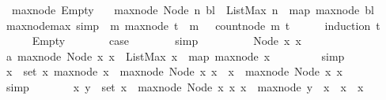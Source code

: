 \begin{isabellebody}
\ \ {\isachardoublequoteopen}max{\isacharunderscore}node\ Empty\ {\isacharequal}\ {}{\isachardoublequoteclose}\isanewline
{\isacharbar}\ {\isachardoublequoteopen}max{\isacharunderscore}node\ {\isacharparenleft}Node\ n\ bl{\isacharparenright}\ {\isacharequal}\ ListMax\ {\isacharparenleft}n\ {\isacharhash}\ {\isacharparenleft}map\ max{\isacharunderscore}node\ bl{\isacharparenright}{\isacharparenright}{\isachardoublequoteclose}\isanewline
\ \ \isanewline
{}\isamarkupfalse%
\ max{\isacharunderscore}node{\isacharunderscore}max\ {\isacharbrackleft}simp{\isacharbrackright}{\isacharcolon}\ {\isachardoublequoteopen}{\isasymforall}\ m{\isachardot}\ max{\isacharunderscore}node\ t\ {\isacharless}\ m\ \ {\isasymlongrightarrow}\ count{\isacharunderscore}node\ m\ t\ {\isacharequal}\ {}{\isachardoublequoteclose}\isanewline
%
\isadelimproof
\ \ %
\endisadelimproof
%
\isatagproof
{}\isamarkupfalse%
\ {\isacharparenleft}induction\ t{\isacharparenright}\isanewline
\ \ \ \ \isamarkupfalse%
\ Empty\isanewline
\ \ \ \ \isamarkupfalse%
\ \isamarkupfalse%
\ {\isacharquery}case\isanewline
\ \ \ \ \ \ \isamarkupfalse%
\ simp\ \isanewline
\ \ \isamarkupfalse%
\isanewline
\ \ \ \ \isamarkupfalse%
\ {\isacharparenleft}Node\ x{}\ x{}{\isacharparenright}\isanewline
\ \ \ \ \isamarkupfalse%
\ a{\isacharcolon}\ {\isachardoublequoteopen}max{\isacharunderscore}node\ {\isacharparenleft}Node\ x{}\ x{}{\isacharparenright}\ {\isacharequal}\ ListMax\ {\isacharparenleft}x{}\ {\isacharhash}\ {\isacharparenleft}map\ max{\isacharunderscore}node\ x{}{\isacharparenright}{\isacharparenright}{\isachardoublequoteclose}\ \isanewline
\ \ \ \ \ \ \isamarkupfalse%
\ simp\isanewline
\ \ \ \ \isamarkupfalse%
\ \isamarkupfalse%
\ {\isachardoublequoteopen}{\isasymforall}x\ {\isasymin}\ set\ x{}{\isachardot}\ max{\isacharunderscore}node\ x\ {\isasymle}\ max{\isacharunderscore}node\ {\isacharparenleft}Node\ x{}\ x{}{\isacharparenright}\ {\isasymand}\ x{}\ {\isasymle}\ max{\isacharunderscore}node\ {\isacharparenleft}Node\ x{}\ x{}{\isacharparenright}{\isachardoublequoteclose}\isanewline
\ \ \ \ \ \ \isamarkupfalse%
\ simp\isanewline
\ \ \ \ \isamarkupfalse%
\ \isamarkupfalse%
\ {\isachardoublequoteopen}{\isasymforall}x{\isachardot}\ {\isasymforall}y\ {\isasymin}\ set\ x{}\ {\isachardot}\ max{\isacharunderscore}node\ {\isacharparenleft}Node\ x{}\ x{}{\isacharparenright}{\isacharless}\ x\ {\isasymlongrightarrow}\ max{\isacharunderscore}node\ y\ {\isacharless}\ x\ {\isasymand}\ x{}\ {\isacharless}\ x{\isachardoublequoteclose}\isanewline

\end{isabellebody}
